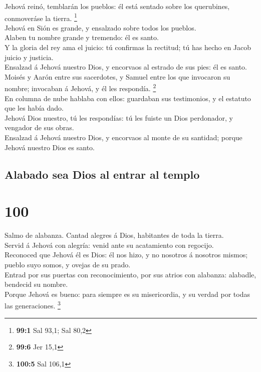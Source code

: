  Jehová reinó, temblarán los pueblos: él está sentado
sobre los querubines, conmoveráse la tierra. \footnote{\textbf{99:1} Sal
  93,1; Sal 80,2}\\
 Jehová en Sión es grande, y ensalzado sobre todos los
pueblos.\\
 Alaben tu nombre grande y tremendo: él es santo.\\
 Y la gloria del rey ama el juicio: tú confirmas la
rectitud; tú has hecho en Jacob juicio y justicia.\\
 Ensalzad á Jehová nuestro Dios, y encorvaos al estrado de
sus pies: él es santo.\\
 Moisés y Aarón entre sus sacerdotes, y Samuel entre los
que invocaron su nombre; invocaban á Jehová, y él les respondía.
\footnote{\textbf{99:6} Jer 15,1}\\
 En columna de nube hablaba con ellos: guardaban sus
testimonios, y el estatuto que les había dado.\\
 Jehová Dios nuestro, tú les respondías: tú les fuiste un
Dios perdonador, y vengador de sus obras.\\
 Ensalzad á Jehová nuestro Dios, y encorvaos al monte de
su santidad; porque Jehová nuestro Dios es santo.

\hypertarget{alabado-sea-dios-al-entrar-al-templo}{%
\subsection{Alabado sea Dios al entrar al
templo}\label{alabado-sea-dios-al-entrar-al-templo}}

\hypertarget{section-99}{%
\section{100}\label{section-99}}

 Salmo de alabanza. Cantad alegres á Dios, habitantes de
toda la tierra.\\
 Servid á Jehová con alegría: venid ante su acatamiento
con regocijo.\\
 Reconoced que Jehová él es Dios: él nos hizo, y no
nosotros á nosotros mismos; pueblo suyo somos, y ovejas de su prado.\\
 Entrad por sus puertas con reconocimiento, por sus atrios
con alabanza: alabadle, bendecid su nombre.\\
 Porque Jehová es bueno: para siempre es su misericordia,
y su verdad por todas las generaciones. \footnote{\textbf{100:5} Sal
  106,1}


